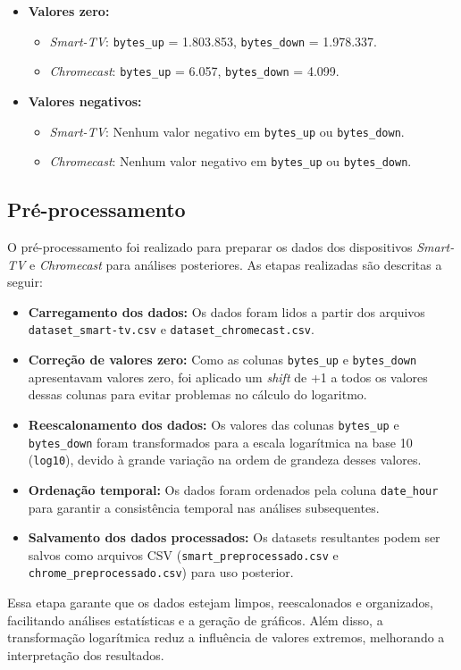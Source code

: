 \begin{itemize}
    \item \textbf{Valores zero:}
    \begin{itemize}
        \item \textit{Smart-TV}: \texttt{bytes\_up} = 1.803.853, \texttt{bytes\_down} = 1.978.337.
        \item \textit{Chromecast}: \texttt{bytes\_up} = 6.057, \texttt{bytes\_down} = 4.099.
    \end{itemize}

    \item \textbf{Valores negativos:}
    \begin{itemize}
        \item \textit{Smart-TV}: Nenhum valor negativo em \texttt{bytes\_up} ou \texttt{bytes\_down}.
        \item \textit{Chromecast}: Nenhum valor negativo em \texttt{bytes\_up} ou \texttt{bytes\_down}.
    \end{itemize}
\end{itemize}

\subsection{Pré-processamento}

O pré-processamento foi realizado para preparar os dados dos dispositivos \textit{Smart-TV} e \textit{Chromecast} para análises posteriores. As etapas realizadas são descritas a seguir:

\begin{itemize}
    \item \textbf{Carregamento dos dados:} Os dados foram lidos a partir dos arquivos \texttt{dataset\_smart-tv.csv} e \texttt{dataset\_chromecast.csv}.

    \item \textbf{Correção de valores zero:} Como as colunas \texttt{bytes\_up} e \texttt{bytes\_down} apresentavam valores zero, foi aplicado um \textit{shift} de +1 a todos os valores dessas colunas para evitar problemas no cálculo do logaritmo.

    \item \textbf{Reescalonamento dos dados:} Os valores das colunas \texttt{bytes\_up} e \texttt{bytes\_down} foram transformados para a escala logarítmica na base 10 (\texttt{log10}), devido à grande variação na ordem de grandeza desses valores.

    \item \textbf{Ordenação temporal:} Os dados foram ordenados pela coluna \texttt{date\_hour} para garantir a consistência temporal nas análises subsequentes.

    \item \textbf{Salvamento dos dados processados:} Os datasets resultantes podem ser salvos como arquivos CSV (\texttt{smart\_preprocessado.csv} e \texttt{chrome\_preprocessado.csv}) para uso posterior.
\end{itemize}

Essa etapa garante que os dados estejam limpos, reescalonados e organizados, facilitando análises estatísticas e a geração de gráficos. Além disso, a transformação logarítmica reduz a influência de valores extremos, melhorando a interpretação dos resultados.

